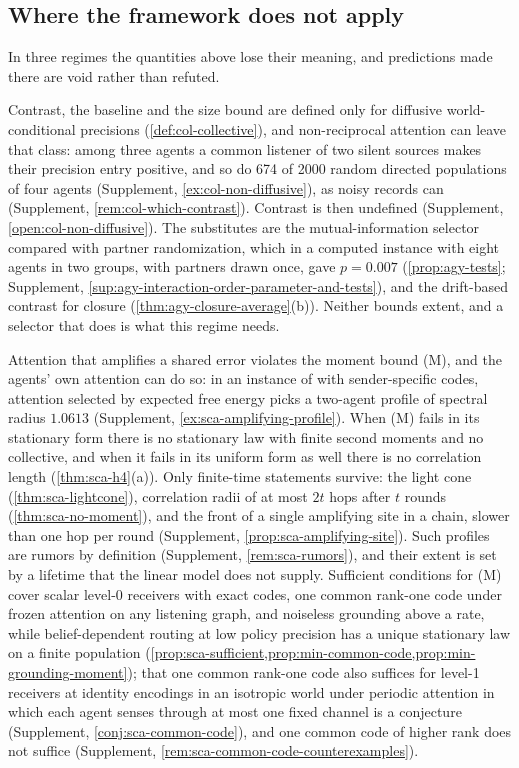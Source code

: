 \subsection{Where the framework does not apply}\label{sec:pre-scope}

In three regimes the quantities above lose their meaning, and predictions made there are void rather than refuted.

Contrast, the baseline and the size bound are defined only for diffusive world-conditional precisions (\cref{def:col-collective}), and non-reciprocal attention can leave that class: among three agents a common listener of two silent sources makes their precision entry positive, and so do 674 of 2000 random directed populations of four agents (Supplement, \cref{ex:col-non-diffusive}), as noisy records can (Supplement, \cref{rem:col-which-contrast}). Contrast is then undefined (Supplement, \cref{open:col-non-diffusive}). The substitutes are the mutual-information selector compared with partner randomization, which in a computed instance with eight agents in two groups, with partners drawn once, gave $p=0.007$ (\cref{prop:agy-tests}; Supplement, \cref{sup:agy-interaction-order-parameter-and-tests}), and the drift-based contrast for closure (\cref{thm:agy-closure-average}(b)). Neither bounds extent, and a selector that does is what this regime needs.

Attention that amplifies a shared error violates the moment bound (M), and the agents' own attention can do so: in an instance of \citet{dennis2026communicating} with sender-specific codes, attention selected by expected free energy picks a two-agent profile of spectral radius $1.0613$ (Supplement, \cref{ex:sca-amplifying-profile}). When (M) fails in its stationary form there is no stationary law with finite second moments and no collective, and when it fails in its uniform form as well there is no correlation length (\cref{thm:sca-h4}(a)). Only finite-time statements survive: the light cone (\cref{thm:sca-lightcone}), correlation radii of at most $2t$ hops after $t$ rounds (\cref{thm:sca-no-moment}), and the front of a single amplifying site in a chain, slower than one hop per round (Supplement, \cref{prop:sca-amplifying-site}). Such profiles are rumors by definition (Supplement, \cref{rem:sca-rumors}), and their extent is set by a lifetime that the linear model does not supply. Sufficient conditions for (M) cover scalar level-0 receivers with exact codes, one common rank-one code under frozen attention on any listening graph, and noiseless grounding above a rate, while belief-dependent routing at low policy precision has a unique stationary law on a finite population (\cref{prop:sca-sufficient,prop:min-common-code,prop:min-grounding-moment}); that one common rank-one code also suffices for level-1 receivers at identity encodings in an isotropic world under periodic attention in which each agent senses through at most one fixed channel is a conjecture (Supplement, \cref{conj:sca-common-code}), and one common code of higher rank does not suffice (Supplement, \cref{rem:sca-common-code-counterexamples}).

